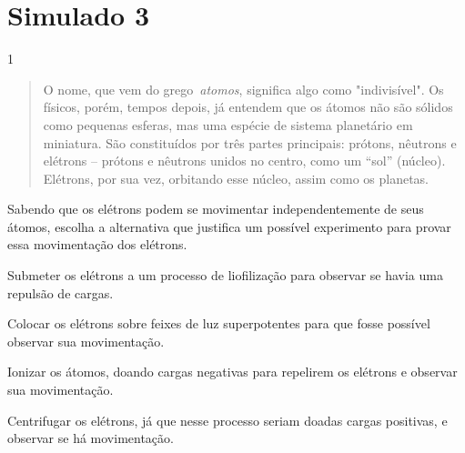 \chapter{Simulado 3}

\num{1}
\begin{quote}
  O nome, que vem do grego~\emph{atomos}, significa algo como "indivisível". Os
  físicos, porém, tempos depois, já entendem que os átomos não são sólidos como pequenas
  esferas, mas uma espécie de sistema planetário em miniatura. São constituídos por três partes principais: prótons, nêutrons e
  elétrons -- prótons e nêutrons unidos no centro, como um ``sol'' (núcleo). Elétrons, por sua vez, orbitando esse núcleo, assim como os planetas. 

\end{quote}

Sabendo que os elétrons podem se movimentar independentemente de seus
átomos, escolha a alternativa que justifica um possível experimento para
provar essa movimentação dos elétrons.

\begin{escolha}
\item
  Submeter os elétrons a um processo de liofilização para observar se havia uma repulsão de cargas.
\item
  Colocar os elétrons sobre feixes de luz superpotentes para que fosse
  possível observar sua movimentação.
\item
  Ionizar os átomos, doando cargas negativas para repelirem os elétrons e
  observar sua movimentação.
\item
  Centrifugar os elétrons, já que nesse processo seriam doadas cargas
  positivas, e observar se há movimentação.
\end{escolha}



